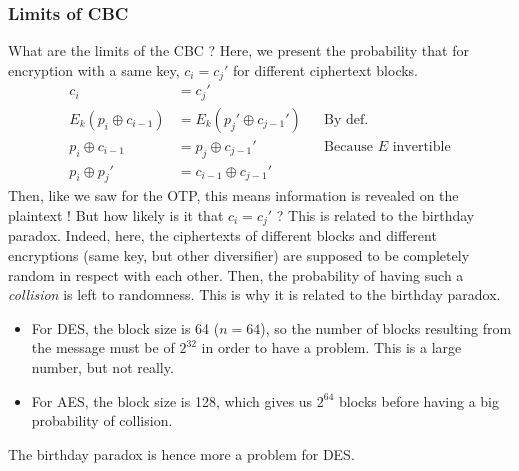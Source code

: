 \documentclass[../Cryptography.tex]{subfiles}
\begin{document}
\subsubsection{Limits of CBC}
What are the limits of the CBC ? Here, we present the probability that for encryption with a same key, $c_i = c_j '$ for different ciphertext blocks.
\begin{align*}
    c_i &= c_j ' \\
    E_k(p_i \oplus c_{i-1}) &= E_k(p_j ' \oplus c_{j-1}') && \text{By def.} \\
    p_i \oplus c_{i-1} &= p_j \oplus c_{j-1}' && \text{Because $E$ invertible} \\
    p_i \oplus p_j ' &= c_{i-1} \oplus c_{j-1}'
\end{align*}
Then, like we saw for the OTP, this means information is revealed on the plaintext ! But how likely is it that $c_i = c_j'$ ? This is related to the birthday paradox. Indeed, here, the ciphertexts of different blocks and different encryptions (same key, but other diversifier) are supposed to be completely random in respect with each other. Then, the probability of having such a \textit{collision} is left to randomness. This is why it is related to the birthday paradox.

\begin{itemize}
    \item For DES, the block size is 64 ($n=64$), so the number of blocks resulting from the message must be of $2^{32}$ in order to have a problem. This is a large number, but not really.
    \item For AES, the block size is 128, which gives us $2^{64}$ blocks before having a big probability of collision.
\end{itemize}
The birthday paradox is hence more a problem for DES.
\end{document}
